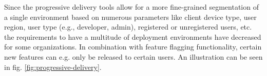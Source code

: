 \begin{figure}[h]
	\centering
	\begin{minipage}{.5\textwidth}
		\centering
		\label{fig:progressive-delivery}
	\end{minipage}%
	\begin{minipage}{.5\textwidth}
		\centering
		\label{fig:deploy-multiple-envs}
	\end{minipage}
\end{figure}

Since the progressive delivery tools allow for a more
fine-grained segmentation
of a single environment based on numerous parameters like
client device type, user region, user type (e.g., developer, admin),
registered or unregistered users, etc.
the requirements to have a multitude of deployment environments
have decreased for some organizations.
In combination with feature flagging functionality,
certain new features can e.g. only be released to certain users.
An illustration can be seen in fig. \ref{fig:progressive-delivery}.

